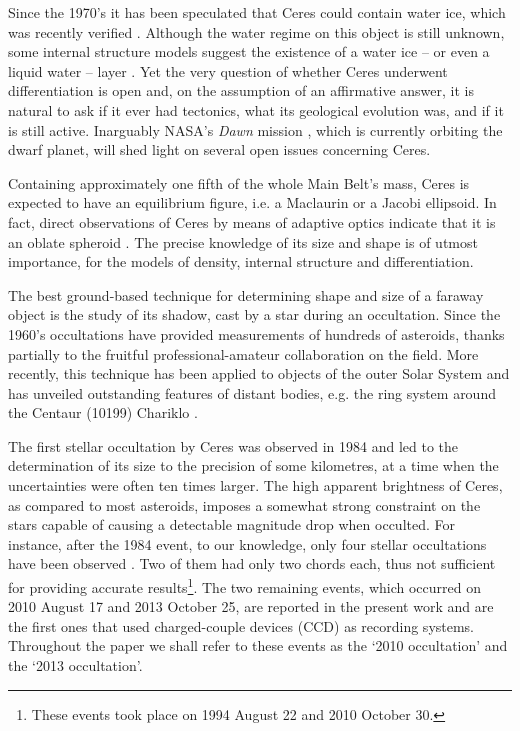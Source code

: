 \documentclass[useAMS,usenatbib]{mn2e}
\begin{document}
Since the 1970's it has been speculated that Ceres could contain water ice, which was recently verified \citep{Kuppers2014}. Although the water regime on this object is still unknown, some internal structure models suggest the existence of a water ice -- or even a liquid water -- layer \citep{CastilloR2011}. Yet the very question of whether Ceres underwent differentiation is open and, on the assumption of an affirmative answer, it is natural to ask if it ever had tectonics, what its geological evolution was, and if it is still active. Inarguably NASA's \textit{Dawn} mission \citep{Russell2004}, which is currently orbiting the dwarf planet, will shed light on several open issues concerning Ceres.

Containing approximately one fifth of the whole Main Belt's mass, Ceres is expected to have an equilibrium figure, i.e. a Maclaurin or a Jacobi ellipsoid. In fact, direct observations of Ceres by means of adaptive optics indicate that it is an oblate spheroid \citep{Drummond2014}. The precise knowledge of its size and shape is of utmost importance, for the models of density, internal structure and differentiation.%

The best ground-based technique for determining shape and size of a faraway object is the study of its shadow, cast by a star during an occultation. Since the 1960's occultations have provided measurements of hundreds of asteroids, thanks partially to the fruitful professional-amateur collaboration on the field. More recently, this technique has been applied to objects of the outer Solar System and has unveiled outstanding features of distant bodies, e.g. the ring system around the Centaur (10199) Chariklo \citep{BragaRibas2014}.

The first stellar occultation by Ceres was observed in 1984 \citep{Millis1987} and led to the determination of its size to the precision of some kilometres, at a time when the uncertainties were often ten times larger. The high apparent brightness of Ceres, as compared to most asteroids, imposes a somewhat strong constraint on the stars capable of causing a detectable magnitude drop when occulted. For instance, after the 1984 event, to our knowledge, only four stellar occultations have been observed \citep{Dunham2014}. Two of them had only two chords each, thus not sufficient for providing accurate results\footnote{These events took place on 1994 August 22 and 2010 October 30.}. The two remaining events, which occurred on 2010 August 17 and 2013 October 25, are reported in the present work and are the first ones that used charged-couple devices (CCD) as recording systems. %
Throughout the paper we shall refer to these events as the `2010 occultation' and the `2013 occultation'.
\end{document}

